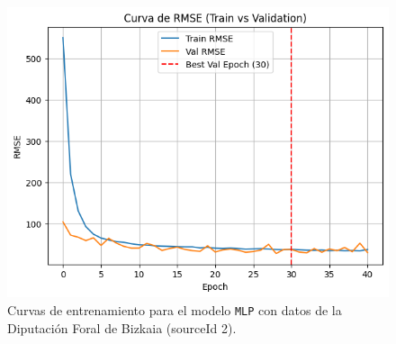\begin{figure}[H]
\begin{minipage}{0.48\textwidth}
		\vspace{0.2cm}
		\includegraphics[width=\linewidth]{includes/cap5/graphs/sid2_mlp_rmse.png}
	\end{minipage}
	\caption{Curvas de entrenamiento para el modelo \texttt{MLP} con datos de la Diputación Foral de Bizkaia (sourceId 2).}
	\label{fig:curvas_sid2_mlp}
\end{figure}

